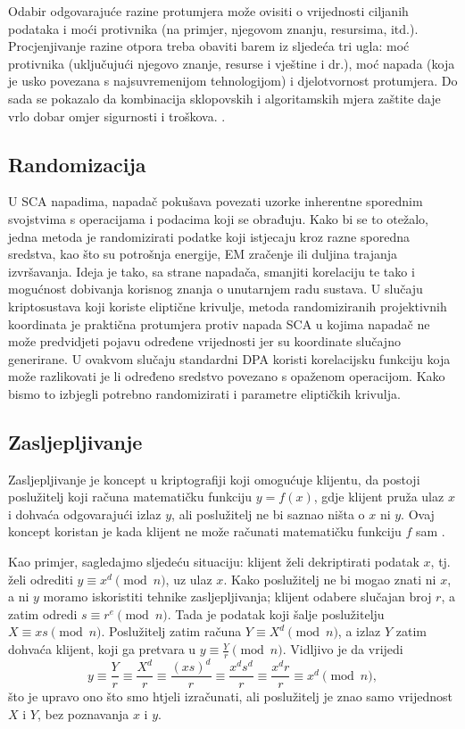 \documentclass[times, utf8, diplomski]{fer}
\begin{document}
Odabir odgovarajuće razine protumjera može ovisiti o vrijednosti ciljanih podataka i moći protivnika (na primjer, njegovom znanju, resursima, itd.). Procjenjivanje razine otpora treba obaviti barem iz sljedeća tri ugla: moć protivnika (uključujući njegovo znanje, resurse i vještine i dr.), moć napada (koja je usko povezana s najsuvremenijom tehnologijom) i djelotvornost protumjera. Do sada se pokazalo da kombinacija sklopovskih i algoritamskih mjera zaštite daje vrlo dobar omjer sigurnosti i troškova. \citep{zhou2005side}.

\subsection{Randomizacija}

U SCA napadima, napadač pokušava povezati uzorke inherentne sporednim svojstvima s operacijama i podacima koji se obrađuju. Kako bi se to otežalo, jedna metoda je randomizirati podatke koji istjecaju kroz razne sporedna sredstva, kao što su potrošnja energije, EM zračenje ili duljina trajanja izvršavanja. Ideja je tako, sa strane napadača, smanjiti korelaciju te tako i mogućnost dobivanja korisnog znanja o unutarnjem radu sustava.
U slučaju kriptosustava koji koriste eliptične krivulje, metoda randomiziranih projektivnih koordinata je praktična protumjera protiv napada SCA u kojima napadač ne može predvidjeti pojavu određene vrijednosti jer su koordinate slučajno generirane. U ovakvom slučaju standardni DPA koristi korelacijsku funkciju koja može razlikovati je li određeno sredstvo povezano s opaženom operacijom. Kako bismo to izbjegli potrebno randomizirati i parametre eliptičkih krivulja.

\subsection{Zasljepljivanje}

Zasljepljivanje je koncept u kriptografiji koji omogućuje klijentu, da postoji poslužitelj koji računa matematičku funkciju \(y = f(x)\), gdje klijent pruža ulaz \(x\) i dohvaća odgovarajući izlaz \(y\), ali poslužitelj ne bi saznao ništa o \(x\) ni \(y\). Ovaj koncept koristan je kada klijent ne može računati matematičku funkciju \(f\) sam \citep{Bleumer2011}.

Kao primjer, sagledajmo sljedeću situaciju: klijent želi dekriptirati podatak \(x\), tj. želi odrediti \(y \equiv x^d \pmod{n}\), uz ulaz \(x\). Kako poslužitelj ne bi mogao znati ni \(x\), a ni \(y\) moramo iskoristiti tehnike zasljepljivanja; klijent odabere slučajan broj \(r\), a zatim odredi \(s \equiv r^e \pmod{n} \). Tada je podatak koji šalje poslužitelju \( X \equiv xs \pmod{n}\). Poslužitelj zatim računa \(Y \equiv X^d \pmod{n}\), a izlaz \(Y\) zatim dohvaća klijent, koji ga pretvara u \(y \equiv \frac{Y}{r} \pmod{n}\). Vidljivo je da vrijedi
\begin{equation}
    y \equiv
    \frac{Y}{r} \equiv
    \frac{X^d}{r} \equiv
    \frac{(xs)^d}{r} \equiv
    \frac{x^d s^d}{r} \equiv
    \frac{x^d r}{r} \equiv
    x^d \pmod{n},
\end{equation}
što je upravo ono što smo htjeli izračunati, ali poslužitelj je znao samo vrijednost \(X\) i \(Y\), bez poznavanja \(x\) i \(y\).
\end{document}
